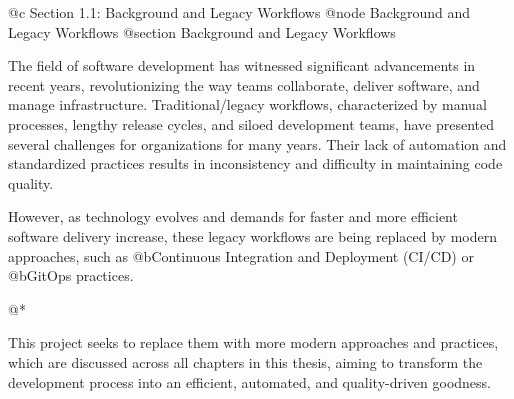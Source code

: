 @c Section 1.1: Background and Legacy Workflows
@node Background and Legacy Workflows
@section Background and Legacy Workflows

The field of software development has witnessed significant advancements in recent years, revolutionizing the way teams collaborate, deliver software, and manage infrastructure. Traditional/legacy workflows, characterized by manual processes, lengthy release cycles, and siloed development teams, have presented several challenges for organizations for many years. Their lack of automation and standardized practices results in inconsistency and difficulty in maintaining code quality.

However, as technology evolves and demands for faster and more efficient software delivery increase, these legacy workflows are being replaced by modern approaches, such as @b{Continuous Integration and Deployment (CI/CD)} or @b{GitOps} practices. 

@*

This project seeks to replace them with more modern approaches and practices, which are discussed across all chapters in this thesis, aiming to transform the development process into an efficient, automated, and quality-driven goodness.

